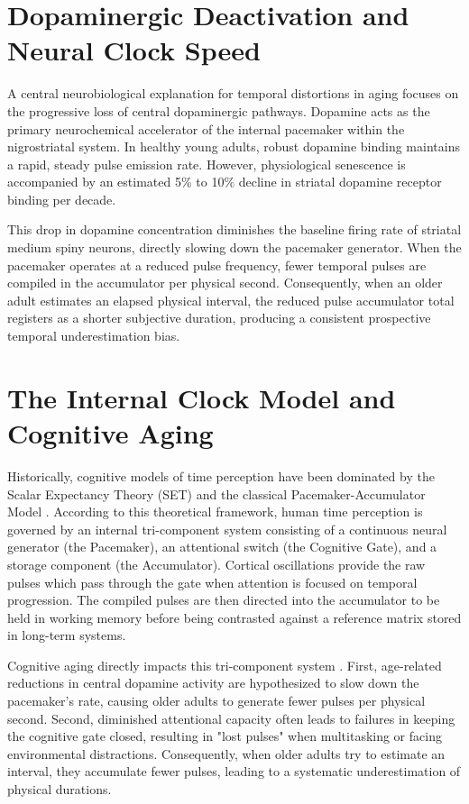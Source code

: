 \documentclass{custom_report}
\begin{document}
\section{Dopaminergic Deactivation and Neural Clock Speed}
A central neurobiological explanation for temporal distortions in aging focuses on the progressive loss of central dopaminergic pathways. Dopamine acts as the primary neurochemical accelerator of the internal pacemaker within the nigrostriatal system. In healthy young adults, robust dopamine binding maintains a rapid, steady pulse emission rate. However, physiological senescence is accompanied by an estimated 5\% to 10\% decline in striatal dopamine receptor binding per decade. 

This drop in dopamine concentration diminishes the baseline firing rate of striatal medium spiny neurons, directly slowing down the pacemaker generator. When the pacemaker operates at a reduced pulse frequency, fewer temporal pulses are compiled in the accumulator per physical second. Consequently, when an older adult estimates an elapsed physical interval, the reduced pulse accumulator total registers as a shorter subjective duration, producing a consistent prospective temporal underestimation bias.

\section{The Internal Clock Model and Cognitive Aging}
Historically, cognitive models of time perception have been dominated by the Scalar Expectancy Theory (SET) and the classical Pacemaker-Accumulator Model \cite{Turgeon2016}. According to this theoretical framework, human time perception is governed by an internal tri-component system consisting of a continuous neural generator (the Pacemaker), an attentional switch (the Cognitive Gate), and a storage component (the Accumulator). Cortical oscillations provide the raw pulses which pass through the gate when attention is focused on temporal progression. The compiled pulses are then directed into the accumulator to be held in working memory before being contrasted against a reference matrix stored in long-term systems.

Cognitive aging directly impacts this tri-component system \cite{Turgeon2016}. First, age-related reductions in central dopamine activity are hypothesized to slow down the pacemaker's rate, causing older adults to generate fewer pulses per physical second. Second, diminished attentional capacity often leads to failures in keeping the cognitive gate closed, resulting in "lost pulses" when multitasking or facing environmental distractions. Consequently, when older adults try to estimate an interval, they accumulate fewer pulses, leading to a systematic underestimation of physical durations.
\end{document}
